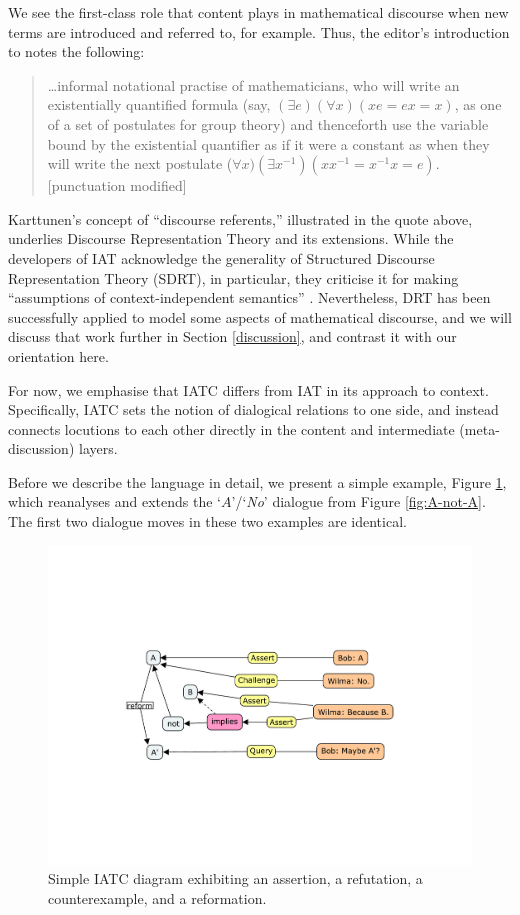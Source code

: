 \documentclass[smallextended,oneside]{svjour3}       %
\let\cite\citep
\newcommand\nothing[1]{#1}
\let\paragraph\nothing
\begin{document}
\paragraph{We see the first-class role that content plays in mathematical discourse when new terms are introduced and referred to, for example.}
Thus, the editor's introduction to
\citet{karttunen1976discourse} notes the following:
\begin{quote}
\ldots informal notational practise of mathematicians, who will write
an existentially quantified formula (say, $(\exists e)(\forall x)(xe =
ex = x)$, as one of a set of postulates for group theory) and
thenceforth use the variable bound by the existential quantifier as if
it were a constant as when they will write the next postulate ($\forall
x)(\exists x^{-1})(xx^{-1} = x^{-1}x = e)$. [punctuation modified]
\end{quote}
Karttunen's concept of ``discourse referents,'' illustrated in the
quote above, underlies Discourse Representation Theory \cite{kamp1993discourse}
and its extensions.
While the developers of IAT acknowledge the generality of Structured
Discourse Representation Theory (SDRT), in particular, they criticise
it for making ``assumptions of context-independent semantics''
\cite{budzynska2016theoretical}.
Nevertheless, DRT has been successfully applied to model some aspects
of mathematical discourse,
and we will discuss that work further in Section \ref{discussion},
and contrast it with our orientation here.

For now, we emphasise that IATC differs from IAT in its approach to
context.
Specifically, IATC sets the notion of dialogical relations to one side, and
instead connects locutions to each other directly in the content and
intermediate (meta-discussion) layers. 

Before we describe the language
in detail, we present a simple example, Figure \ref{fig:A-Counterexample}, which reanalyses and extends the `$A$'/`\emph{No}' dialogue from Figure \ref{fig:A-not-A}.  The first two
dialogue moves in these two examples are identical.

\begin{figure}
\vspace{-1.05cm}
\hspace{-.2cm}\includegraphics[width=.5\textwidth,trim=5cm 6cm 5cm 5.5cm, clip]{A-CounterExample-Rev}
\caption{Simple IATC diagram exhibiting an assertion, a refutation, a counterexample, and a reformation.\label{fig:A-Counterexample}}
\vspace{-.6cm}
\end{figure}
\end{document}
